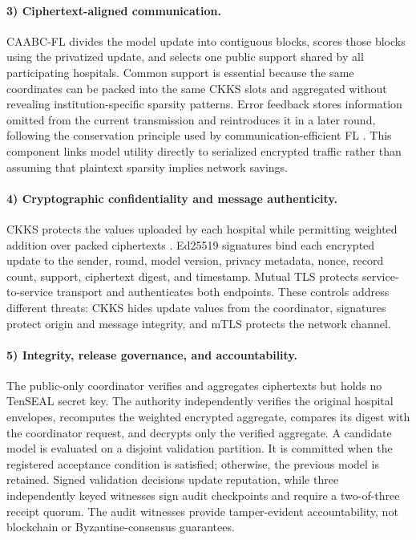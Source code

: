 \paragraph{3) Ciphertext-aligned communication.}
CAABC-FL divides the model update into contiguous blocks, scores those blocks using the privatized update, and selects one public support shared by all participating hospitals. Common support is essential because the same coordinates can be packed into the same CKKS slots and aggregated without revealing institution-specific sparsity patterns. Error feedback stores information omitted from the current transmission and reintroduces it in a later round, following the conservation principle used by communication-efficient FL \cite{li2023fedef}. This component links model utility directly to serialized encrypted traffic rather than assuming that plaintext sparsity implies network savings.

\paragraph{4) Cryptographic confidentiality and message authenticity.}
CKKS protects the values uploaded by each hospital while permitting weighted addition over packed ciphertexts \cite{cheon2017homomorphic}. Ed25519 signatures bind each encrypted update to the sender, round, model version, privacy metadata, nonce, record count, support, ciphertext digest, and timestamp. Mutual TLS protects service-to-service transport and authenticates both endpoints. These controls address different threats: CKKS hides update values from the coordinator, signatures protect origin and message integrity, and mTLS protects the network channel.

\paragraph{5) Integrity, release governance, and accountability.}
The public-only coordinator verifies and aggregates ciphertexts but holds no TenSEAL secret key. The authority independently verifies the original hospital envelopes, recomputes the weighted encrypted aggregate, compares its digest with the coordinator request, and decrypts only the verified aggregate. A candidate model is evaluated on a disjoint validation partition. It is committed when the registered acceptance condition is satisfied; otherwise, the previous model is retained. Signed validation decisions update reputation, while three independently keyed witnesses sign audit checkpoints and require a two-of-three receipt quorum. The audit witnesses provide tamper-evident accountability, not blockchain or Byzantine-consensus guarantees.


